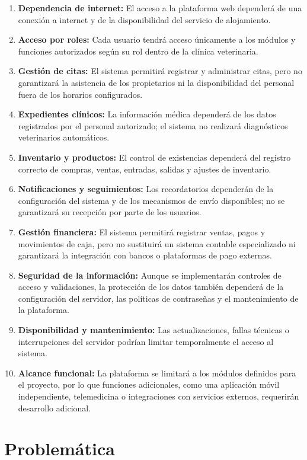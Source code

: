 \begin{enumerate}
    \item \textbf{Dependencia de internet:} El acceso a la plataforma web dependerá de una conexión a internet y de la disponibilidad del servicio de alojamiento.
    \item \textbf{Acceso por roles:} Cada usuario tendrá acceso únicamente a los módulos y funciones autorizados según su rol dentro de la clínica veterinaria.
    \item \textbf{Gestión de citas:} El sistema permitirá registrar y administrar citas, pero no garantizará la asistencia de los propietarios ni la disponibilidad del personal fuera de los horarios configurados.
    \item \textbf{Expedientes clínicos:} La información médica dependerá de los datos registrados por el personal autorizado; el sistema no realizará diagnósticos veterinarios automáticos.
    \item \textbf{Inventario y productos:} El control de existencias dependerá del registro correcto de compras, ventas, entradas, salidas y ajustes de inventario.
    \item \textbf{Notificaciones y seguimientos:} Los recordatorios dependerán de la configuración del sistema y de los mecanismos de envío disponibles; no se garantizará su recepción por parte de los usuarios.
    \item \textbf{Gestión financiera:} El sistema permitirá registrar ventas, pagos y movimientos de caja, pero no sustituirá un sistema contable especializado ni garantizará la integración con bancos o plataformas de pago externas.
    \item \textbf{Seguridad de la información:} Aunque se implementarán controles de acceso y validaciones, la protección de los datos también dependerá de la configuración del servidor, las políticas de contraseñas y el mantenimiento de la plataforma.
    \item \textbf{Disponibilidad y mantenimiento:} Las actualizaciones, fallas técnicas o interrupciones del servidor podrían limitar temporalmente el acceso al sistema.
    \item \textbf{Alcance funcional:} La plataforma se limitará a los módulos definidos para el proyecto, por lo que funciones adicionales, como una aplicación móvil independiente, telemedicina o integraciones con servicios externos, requerirán desarrollo adicional.
\end{enumerate}

\section{Problemática}


